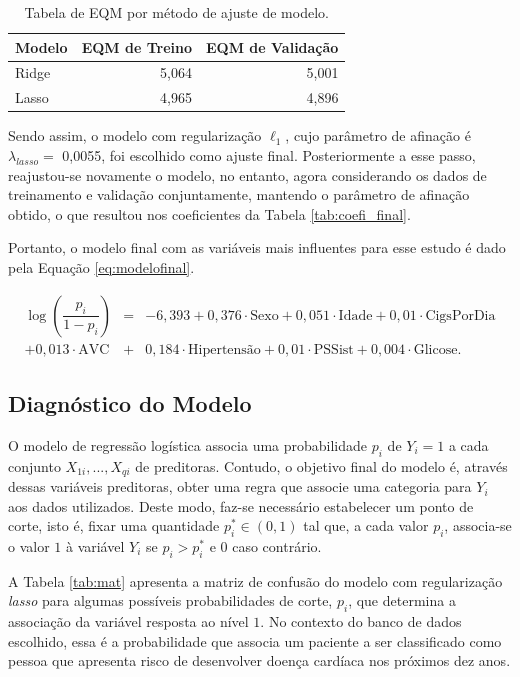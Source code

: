 \documentclass[
  12pt,
]{article}
\begin{document}
\begin{table}[H]

\caption{\label{tab:aval}Tabela de EQM por método de ajuste de modelo.}
\centering
\fontsize{10}{12}\selectfont
\begin{tabular}[t]{lrr}
\toprule
Modelo & EQM de Treino & EQM de Validação\\
\midrule
Ridge & 5,064 & 5,001\\
Lasso & 4,965 & 4,896\\
\bottomrule
\end{tabular}
\end{table}

\quad Sendo assim, o modelo com regularização \(\ell_1\), cujo parâmetro
de afinação é \(\lambda_{lasso}=\) 0,0055, foi escolhido como ajuste
final. Posteriormente a esse passo, reajustou-se novamente o modelo, no
entanto, agora considerando os dados de treinamento e validação
conjuntamente, mantendo o parâmetro de afinação obtido, o que resultou
nos coeficientes da Tabela \ref{tab:coefi_final}.

\quad Portanto, o modelo final com as variáveis mais influentes para
esse estudo é dado pela Equação \ref{eq:modelofinal}.

\begin{eqnarray}
\label{eq:modelofinal}
\log\left(\dfrac{p_i}{1-p_i}\right) &=& -6,393 + 0,376 \cdot \text{Sexo} + 0,051\cdot \text{Idade} + 0,01 \cdot \text{CigsPorDia}\nonumber \\
+ 0,013 \cdot \text{AVC} &+& 0,184 \cdot \text{Hipertensão} + 0,01 \cdot \text{PSSist} + 0,004 \cdot \text{Glicose}.
\end{eqnarray}

\subsection{Diagnóstico do Modelo}

\quad O modelo de regressão logística associa uma probabilidade \(p_i\)
de \(Y_i = 1\) a cada conjunto \(X_{1i},...,X_{qi}\) de preditoras.
Contudo, o objetivo final do modelo é, através dessas variáveis
preditoras, obter uma regra que associe uma categoria para \(Y_i\) aos
dados utilizados. Deste modo, faz-se necessário estabelecer um ponto de
corte, isto é, fixar uma quantidade \(p_i^* \in (0,1)\) tal que, a cada
valor \(p_i\), associa-se o valor \(1\) à variável \(Y_i\) se
\(p_i > p_i^*\) e \(0\) caso contrário.

\quad A Tabela \ref{tab:mat} apresenta a matriz de confusão do modelo
com regularização \emph{lasso} para algumas possíveis probabilidades de
corte, \(p_i\), que determina a associação da variável resposta ao nível
\(1\). No contexto do banco de dados escolhido, essa é a probabilidade
que associa um paciente a ser classificado como pessoa que apresenta
risco de desenvolver doença cardíaca nos próximos dez anos.
\end{document}
